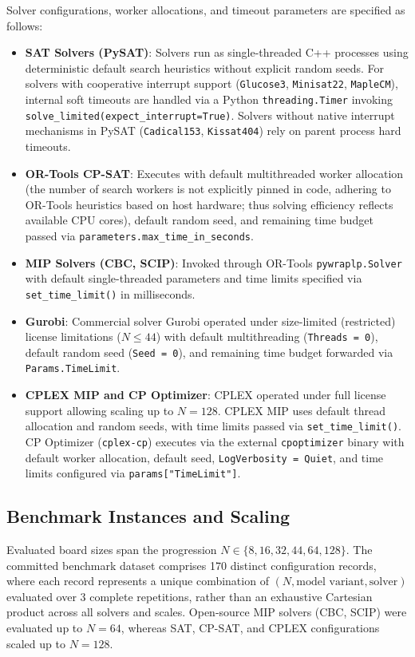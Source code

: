\documentclass[a4paper,fleqn]{cas-sc}
\begin{document}
Solver configurations, worker allocations, and timeout parameters are specified as follows:
\begin{itemize}
    \item \textbf{SAT Solvers (PySAT)}: Solvers run as single-threaded C++ processes using deterministic default search heuristics without explicit random seeds. For solvers with cooperative interrupt support (\texttt{Glucose3}, \texttt{Minisat22}, \texttt{MapleCM}), internal soft timeouts are handled via a Python \texttt{threading.Timer} invoking \texttt{solve\_limited(expect\_interrupt=True)}. Solvers without native interrupt mechanisms in PySAT (\texttt{Cadical153}, \texttt{Kissat404}) rely on parent process hard timeouts.
    \item \textbf{OR-Tools CP-SAT}: Executes with default multithreaded worker allocation (the number of search workers is not explicitly pinned in code, adhering to OR-Tools heuristics based on host hardware; thus solving efficiency reflects available CPU cores), default random seed, and remaining time budget passed via \texttt{parameters.max\_time\_in\_seconds}.
    \item \textbf{MIP Solvers (CBC, SCIP)}: Invoked through OR-Tools \texttt{pywraplp.Solver} with default single-threaded parameters and time limits specified via \texttt{set\_time\_limit()} in milliseconds.
    \item \textbf{Gurobi}: Commercial solver Gurobi operated under size-limited (restricted) license limitations ($N \le 44$) with default multithreading (\texttt{Threads = 0}), default random seed (\texttt{Seed = 0}), and remaining time budget forwarded via \texttt{Params.TimeLimit}.
    \item \textbf{CPLEX MIP and CP Optimizer}: CPLEX operated under full license support allowing scaling up to $N = 128$. CPLEX MIP uses default thread allocation and random seeds, with time limits passed via \texttt{set\_time\_limit()}. CP Optimizer (\texttt{cplex-cp}) executes via the external \texttt{cpoptimizer} binary with default worker allocation, default seed, \texttt{LogVerbosity = Quiet}, and time limits configured via \texttt{params["TimeLimit"]}.
\end{itemize}

\subsection{Benchmark Instances and Scaling}
Evaluated board sizes span the progression $N \in \{8, 16, 32, 44, 64, 128\}$. The committed benchmark dataset comprises 170 distinct configuration records, where each record represents a unique combination of $(N, \text{model variant}, \text{solver})$ evaluated over 3 complete repetitions, rather than an exhaustive Cartesian product across all solvers and scales. Open-source MIP solvers (CBC, SCIP) were evaluated up to $N = 64$, whereas SAT, CP-SAT, and CPLEX configurations scaled up to $N = 128$.
\end{document}
